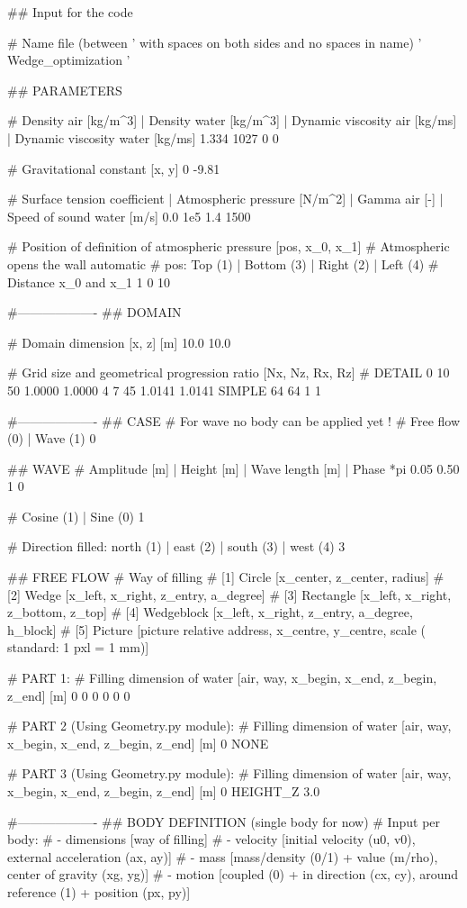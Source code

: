 ## Input for the code

# Name file (between ' with spaces on both sides and no spaces in name)
' Wedge_optimization '

## PARAMETERS

# Density air [kg/m^3] | Density water [kg/m^3] | Dynamic viscosity air [kg/ms] | Dynamic viscosity water [kg/ms]
1.334 1027 0 0

# Gravitational constant [x, y]
0 -9.81

# Surface tension coefficient | Atmospheric pressure [N/m^2] | Gamma air [-]	| Speed of sound water [m/s]
0.0 	1e5 	1.4		1500

# Position of definition of atmospheric pressure [pos, x_0, x_1]
# Atmospheric opens the wall automatic
# pos: Top (1)	| Bottom (3)	| Right (2)		| Left (4)
# Distance x_0 and x_1
1 0 10

#-------------------
## DOMAIN

# Domain dimension [x, z] [m]
10.0 10.0

# Grid size and geometrical progression ratio [Nx, Nz, Rx, Rz]
# DETAIL 0 10 50 1.0000 1.0000 4 7 45 1.0141 1.0141
SIMPLE 64 64 1 1


#-------------------
## CASE
# For wave no body can be applied yet !
# Free flow (0)	| Wave (1)
0

## WAVE
# Amplitude [m] | Height [m]	| Wave length [m]	| Phase *pi
0.05 	0.50		1		0

# Cosine (1)	| Sine (0)
1

# Direction filled: north (1)	| east (2)	|	south (3)	| west (4)
3

## FREE FLOW
# Way of filling
# [1] Circle        [x_center, z_center, radius]
# [2] Wedge         [x_left, x_right, z_entry, a_degree]
# [3] Rectangle     [x_left, x_right, z_bottom, z_top]
# [4] Wedgeblock    [x_left, x_right, z_entry, a_degree, h_block]
# [5] Picture		[picture relative address, x_centre, y_centre, scale ( standard: 1 pxl = 1 mm)]

# PART 1:
# Filling dimension of water [air, way, x_begin, x_end, z_begin, z_end] [m]
0 0 0 0 0 0

# PART 2 (Using Geometry.py module):
# Filling dimension of water [air, way, x_begin, x_end, z_begin, z_end] [m]
0 NONE

# PART 3 (Using Geometry.py module):
# Filling dimension of water [air, way, x_begin, x_end, z_begin, z_end] [m]
0 HEIGHT_Z 3.0

#-------------------
## BODY DEFINITION (single body for now)
# Input per body:
# - dimensions      [way of filling]
# - velocity        [initial velocity (u0, v0), external acceleration (ax, ay)]
# - mass            [mass/density (0/1) + value (m/rho), center of gravity (xg, yg)]
# - motion          [coupled (0) + in direction (cx, cy), around reference (1) + position (px, py)]

